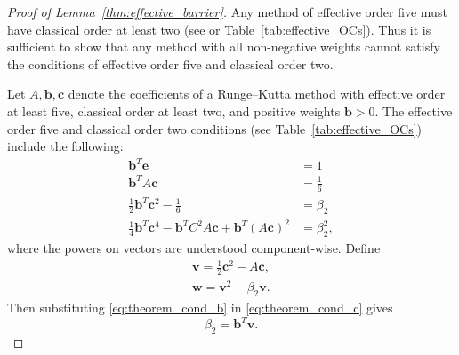 \begin{proof}[Proof of Lemma~\ref{thm:effective_barrier}]
	Any method of effective order five must have classical order at least two
	(see \cite{Butcher2008_book} or Table~\ref{tab:effective_OCs}).
    Thus it is sufficient to show that any method with all non-negative weights
    cannot satisfy the conditions of effective order five and classical order two.

    Let $A,\bm{b},\bm{c}$ denote the coefficients of a Runge--Kutta method with
    effective order at least five, classical order at least two, and positive 
    weights $\bm{b} > 0$.  The effective order five and classical
    order two conditions (see Table~\ref{tab:effective_OCs}) include the following:
    \begin{subequations}\label{eq:theorem_cond}
    		\begin{align}
    			\bm{b}^T\bm{e} & = 1 \label{eq:theorem_cond_a} \\
             	\bm{b}^TA\bm{c} &= \frac{1}{6} \label{eq:theorem_cond_b} \\
            	\frac{1}{2}\bm{b}^T\bm{c}^2 - \frac{1}{6} &= \beta_2 \label{eq:theorem_cond_c} \\
            	\frac{1}{4}\bm{b}^T\bm{c}^4 - \bm{b}^TC^2A\bm{c} + \bm{b}^T(A\bm{c})^2 &= \beta_2^2, \label{eq:theorem_cond_d}
        	\end{align}
	\end{subequations}
	where the powers on vectors are understood component-wise. 
	Define
	\begin{align*} 
		\bm{v} = \frac{1}{2}\bm{c}^2 - A\bm{c}, \\
		\bm{w} = \bm{v}^{2} - \beta_{2}\bm{v}.
	\end{align*}
	Then substituting \eqref{eq:theorem_cond_b} in \eqref{eq:theorem_cond_c} gives
	\begin{equation}\label{eq:btv}
		\beta_2 = \bm{b}^T\bm{v}.
	\end{equation}

\end{proof}
